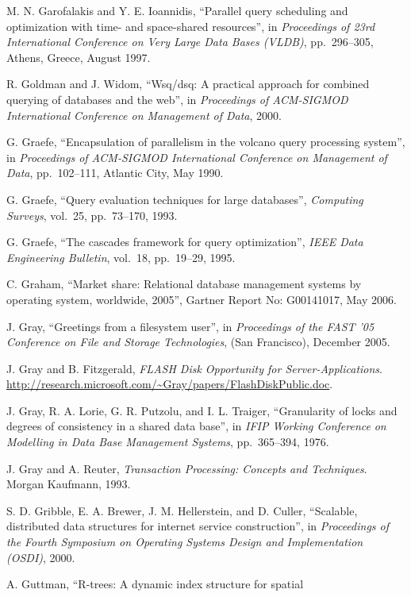 \documentclass[a4paper,11pt,twoside,openright]{book}
\begin{document}
\begin{enumerate}[label={[\arabic*]}]
  M. N. Garofalakis and Y. E. Ioannidis, ``Parallel query scheduling and
  optimization with time- and space-shared resources'', in
  \emph{Proceedings of 23rd International Conference on Very Large Data
  Bases (VLDB)}, pp.~296--305, Athens, Greece, August 1997.
\item
  R. Goldman and J. Widom, ``Wsq/dsq: A practical approach for combined
  querying of databases and the web'', in \emph{Proceedings of
  ACM-SIGMOD International Conference on Management of Data}, 2000.
\item
  G. Graefe, ``Encapsulation of parallelism in the volcano query
  processing system'', in \emph{Proceedings of ACM-SIGMOD International
  Conference on Management of Data}, pp.~102--111, Atlantic City, May
  1990.
\item
  G. Graefe, ``Query evaluation techniques for large databases'',
  \emph{Computing Surveys}, vol.~25, pp.~73--170, 1993.
\item
  G. Graefe, ``The cascades framework for query optimization'',
  \emph{IEEE Data Engineering Bulletin}, vol.~18, pp.~19--29, 1995.
\item
  C. Graham, ``Market share: Relational database management systems by
  operating system, worldwide, 2005'', Gartner Report No: G00141017, May
  2006.
\item
  J. Gray, ``Greetings from a filesystem user'', in \emph{Proceedings of
  the FAST '05} \emph{Conference on File and Storage Technologies}, (San
  Francisco), December 2005.
\item
  J. Gray and B. Fitzgerald, \emph{FLASH Disk Opportunity for
  Server-Applications}.
  \url{http://research.microsoft.com/~Gray/papers/FlashDiskPublic.doc}.
\item
  J. Gray, R. A. Lorie, G. R. Putzolu, and I. L. Traiger, ``Granularity
  of locks and degrees of consistency in a shared data base'', in
  \emph{IFIP Working Conference} \emph{on Modelling in Data Base
  Management Systems}, pp.~365--394, 1976.
\item
  J. Gray and A. Reuter, \emph{Transaction Processing: Concepts and
  Techniques}. Morgan Kaufmann, 1993.
\item
  S. D. Gribble, E. A. Brewer, J. M. Hellerstein, and D. Culler,
  ``Scalable, distributed data structures for internet service
  construction'', in \emph{Proceedings of the} \emph{Fourth Symposium on
  Operating Systems Design and Implementation (OSDI)}, 2000.
\item
  A. Guttman, ``R-trees: A dynamic index structure for spatial

\end{enumerate}
\end{document}
